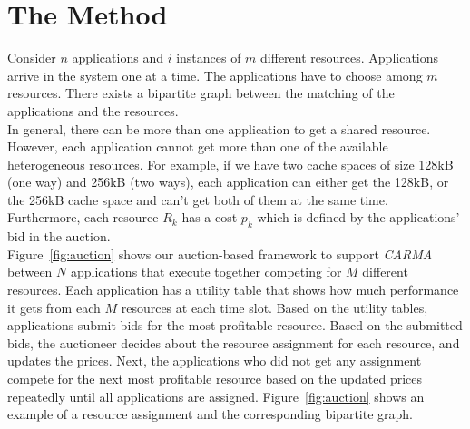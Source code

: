 \section{The Method}\label{Problem_definition}
Consider $n$ applications and $i$ instances of $m$ different resources. Applications arrive in the system one at a time. The applications have to choose among $m$ resources. There exists a bipartite graph between the matching of the applications and the resources.\\
\indent In general, there can be more than one application to get a shared resource. However, each application cannot get more than one of the available heterogeneous resources. For example, if we have two cache spaces of size 128kB (one way) and 256kB (two ways), each application can either get the 128kB, or the 256kB cache space and can't get both of them at the same time. Furthermore, each resource $R_k$ has a cost $p_k$ which is defined by the applications' bid in the auction. \\
\indent Figure~\ref{fig:auction} shows our auction-based framework to support \textit{CARMA} between $N$ applications that execute together competing for $M$ different resources. Each application has a utility table that shows how much performance it gets from each $M$ resources at each time slot. Based on the utility tables, applications submit bids for the most profitable resource. Based on the submitted bids, the auctioneer decides about the resource assignment for each resource, and updates the prices. Next, the applications who did not get any assignment compete for the next most profitable resource based on the updated prices repeatedly until all applications are assigned.  Figure~\ref{fig:auction} shows an example of a resource assignment and the corresponding bipartite graph.
